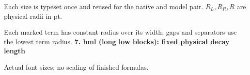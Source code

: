 \documentclass{article}
\newcommand\High{\frac{\displaystyle\sum_{k=1}^n x_k}{1+\frac pq}}
\newcommand\Mark[1]{\directlua{grid.mark(#1)}}
\begin{document}
\par\medskip
Each size is typeset once and reused for the native and model pair. $R_L,R_R,R$ are physical radii in pt.\par
Each marked term has constant radius over its width; gaps and separators use the lowest term radius.
\newpage
{\Large\bfseries 7. hml (long low blocks): fixed physical decay length}\par\medskip
{} Actual font sizes; no scaling of finished formulas.\par\medskip
\end{document}
